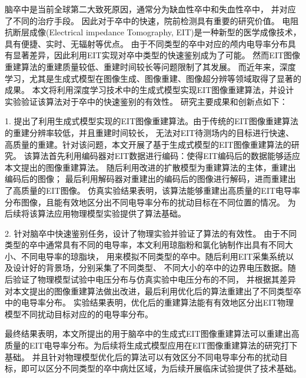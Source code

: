 
\begin{chineseabstract}

    脑卒中是当前全球第二大致死原因，通常分为缺血性卒中和失血性卒中，
    并对应了不同的治疗手段。
    因此对于卒中的快速，院前检测具有重要的研究价值。
    电阻抗断层成像(Electrical impedance Tomography, EIT)是一种新型的医学成像技术，具有便捷、实时、无辐射等优点。
    由于不同类型的卒中对应的颅内电导率分布具有显著差异，因此利用EIT实现对卒中类型的快速鉴别成为了可能。
    然而EIT图像重建算法的重建质量较低、重建时间较长等问题限制了其发展。
    而近年来，深度学习，尤其是生成式模型在图像生成、图像重建、图像超分辨等领域取得了显著的成果。
    本文将利用深度学习技术中的生成式模型实现EIT图像重建算法，并设计实验验证该算法对于卒中的快速鉴别的有效性。
    研究主要成果和创新点如下：

    1. 提出了利用生成式模型实现的EIT图像重建算法。由于传统的EIT图像重建算法的重建分辨率较低，并且重建时间较长，
    无法对EIT待测场内的目标进行快速、高质量的重建。针对该问题，本文开展了基于生成式模型的EIT图像重建算法的研究。
    该算法首先利用编码器对EIT数据进行编码：使得EIT编码后的数据能够适应本文提出的图像重建算法。
    随后利用改进的扩散模型为重建算法的主体，重建出编码后的图像；
    最后利用解码器对重建出的编码后的图像进行解码，进而重建出了高质量的EIT图像。
    仿真实验结果表明，该算法能够重建出高质量的EIT电导率分布图像，且能有效地区分出不同电导率分布的扰动目标在不同位置的情况。
    为后续将该算法应用物理模型实验提供了算法基础。
    

    2. 针对脑卒中快速鉴别任务，设计了物理实验并验证了算法的有效性。
    由于不同类型的卒中通常具有不同的电导率，本文利用琼脂粉和氯化钠制作出具有不同大小、不同电导率的琼脂块，
    用来模拟不同类型的卒中。随后利用EIT采集系统以及设计好的背景场，分别采集了不同类型、
    不同大小的卒中的边界电压数据。随后验证了物理模型试验中电压分布与仿真实验中电压分布的不同，
    并根据其差异对本文提出的图像重建算法做出改进，最后利用优化后的算法重建出了不同类型卒中的电导率分布。
    实验结果表明，优化后的重建算法能有有效地区分出EIT物理模型不同扰动目标对应的的电导率分布。
    
    最终结果表明，本文所提出的用于脑卒中的生成式EIT图像重建算法可以重建出高质量的EIT电导率分布。为后续将生成式模型应用在EIT图像重建算法的研究打下基础。
    并且针对物理模型优化后的算法可以有效区分不同电导率分布的扰动目标，即可以区分不同类型的卒中病灶区域，为后续开展临床试验提供了技术基础。






\end{chineseabstract}

